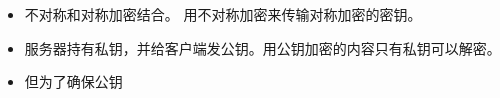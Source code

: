 
\begin{itemize}
\item 不对称和对称加密结合。 用不对称加密来传输对称加密的密钥。
\item 服务器持有私钥，并给客户端发公钥。用公钥加密的内容只有私钥可以解密。
\item 但为了确保公钥
\end{itemize}

